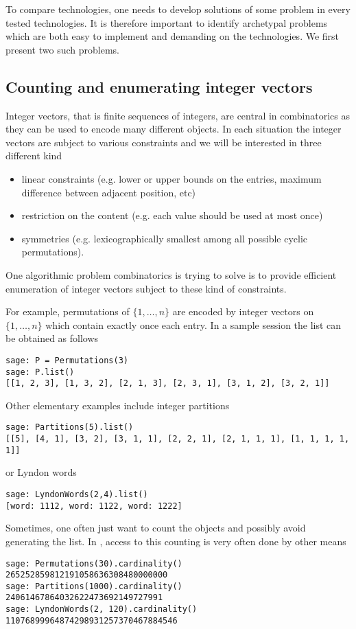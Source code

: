 \documentclass{deliverablereport}
\begin{document}
To compare technologies, one needs to develop solutions of some problem in
every tested technologies. It is therefore important to identify archetypal
problems which are both easy to implement and demanding on the technologies.
We first present two such problems.

\subsection{Counting and enumerating integer vectors}
\label{subsec:intro:integer:vectors}

Integer vectors, that is finite sequences of integers, are central
in combinatorics as they can be used to encode many different
objects. In each situation the integer vectors are subject to various
constraints and we will be interested in three different kind
\begin{itemize}
\item linear constraints (e.g. lower or upper bounds on the entries,
maximum difference between adjacent position, etc)
\item restriction on the content (e.g. each value should be used
at most once)
\item symmetries (e.g. lexicographically smallest among all possible
cyclic permutations).
\end{itemize}
One algorithmic problem combinatorics is trying to solve is to provide
efficient enumeration of integer vectors subject to these kind of
constraints.

For example, permutations of $\{1, \ldots, n\}$ are encoded by integer vectors
on $\{1, \ldots, n\}$ which contain exactly once each entry. In a sample
\Sage session the list can be obtained as follows
\begin{verbatim}
sage: P = Permutations(3)
sage: P.list()
[[1, 2, 3], [1, 3, 2], [2, 1, 3], [2, 3, 1], [3, 1, 2], [3, 2, 1]]
\end{verbatim}
Other elementary examples include integer partitions
\begin{verbatim}
sage: Partitions(5).list()
[[5], [4, 1], [3, 2], [3, 1, 1], [2, 2, 1], [2, 1, 1, 1], [1, 1, 1, 1, 1]]
\end{verbatim}
or Lyndon words
\begin{verbatim}
sage: LyndonWords(2,4).list()
[word: 1112, word: 1122, word: 1222]
\end{verbatim}

Sometimes, one often just want to count the objects and possibly avoid
generating the list. In \Sage, access to this counting is very often
done by other means
\begin{verbatim}
sage: Permutations(30).cardinality()
265252859812191058636308480000000
sage: Partitions(1000).cardinality()
24061467864032622473692149727991
sage: LyndonWords(2, 120).cardinality()
11076899964874298931257370467884546
\end{verbatim}
\end{document}
